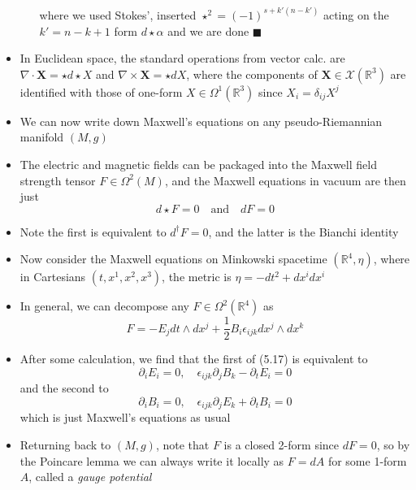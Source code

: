 \documentclass[12pt,a4paper]{article}
\numberwithin{equation}{section}
\begin{document}
\begin{itemize}
\begin{itemize}
\begin{equation}
\begin{aligned}
				\end{aligned}
			\end{equation}
			where we used Stokes', inserted $\star^{2}=(-1)^{s+k'(n-k')}$ acting on the $k'=n-k+1$ form $d\star\alpha$ and we are done $\blacksquare$
		\end{itemize}
		\item In Euclidean space, the standard operations from vector calc. are $\nabla\cdot \mathbf{X}=\star d\star X$ and $\nabla \times \mathbf{X}=\star dX$, where the components of $\mathbf{X}\in\mathcal{X}(\mathbb{R}^{3})$ are identified with those of one-form $X\in\Omega^{1}(\mathbb{R}^{3})$ since $X_{i}=\delta_{ij}X^{j}$
		\item We can now write down Maxwell's equations on any pseudo-Riemannian manifold $(M,g)$
		\item The electric and magnetic fields can be packaged into the Maxwell field strength tensor $F\in\Omega^{2}(M)$, and the Maxwell equations in vacuum are then just
		\begin{equation}
			d\star F=0\quad\text{and}\quad dF=0
		\end{equation}
		\item Note the first is equivalent to $d^{\dagger}F=0$, and the latter is the Bianchi identity
		\item Now consider the Maxwell equations on Minkowski spacetime $(\mathbb{R}^{4},\eta)$, where in Cartesians $(t,x^{1},x^{2},x^{3})$, the metric is $\eta=-dt^{2}+dx^{i}dx^{i}$
		\item In general, we can decompose any $F\in\Omega^{2}(\mathbb{R}^{4})$ as
		\begin{equation}
			F=-E_{j}dt\wedge dx^{j}+\frac{1}{2}B_{i}\epsilon_{ijk}dx^{j}\wedge dx^{k}
		\end{equation}
		\item After some calculation, we find that the first of (5.17) is equivalent to 
		\begin{equation}
			\partial_{i}E_{i}=0,\quad\epsilon_{ijk}\partial_{j}B_{k}-\partial_{t}E_{i}=0
		\end{equation}
		and the second to
		\begin{equation}
			\partial_{i}B_{i}=0,\quad\epsilon_{ijk}\partial_{j}E_{k}+\partial_{t}B_{i}=0
		\end{equation}
		which is just Maxwell's equations as usual
		\item Returning back to $(M,g)$, note that $F$ is a closed 2-form since $dF=0$, so by the Poincare lemma we can always write it locally as $F=dA$ for some 1-form $A$, called a \textit{gauge potential}

\end{itemize}
\end{document}
